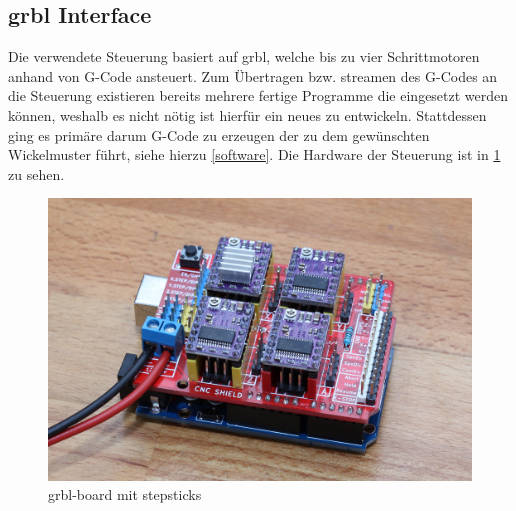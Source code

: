 \documentclass[paper=A4,pagesize,DIV=18, 12pt,listof=totoc,bibliography=totoc,headings=optiontohead,open=any]{article}
\begin{document}
\subsection{grbl Interface}
Die verwendete Steuerung basiert auf grbl\cite{grbl}, welche bis zu vier Schrittmotoren anhand von G-Code ansteuert. Zum Übertragen bzw. streamen des G-Codes an die Steuerung existieren bereits mehrere fertige Programme die eingesetzt werden können, weshalb es nicht nötig ist hierfür ein neues zu entwickeln. Stattdessen ging es primäre darum G-Code zu erzeugen der zu dem gewünschten Wickelmuster führt, siehe hierzu \ref{software}. Die Hardware der Steuerung ist in \ref{fig:grbl_board} zu sehen.
\begin{figure}[H]
	\centering
	\includegraphics[width=1\textwidth]{bilder/IMG_2662.JPG}
	\caption{grbl-board mit stepsticks} 
	\label{fig:grbl_board}
\end{figure}

\newpage
\printbibliography
\end{document}
